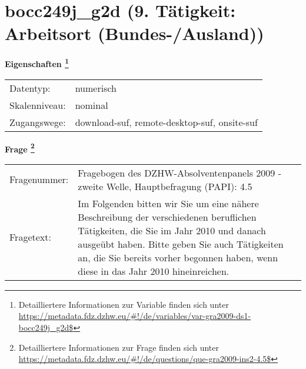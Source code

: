 
    \setcounter{footnote}{0}

    \vspace*{-1.8cm}
	\section{bocc249j\_g2d (9. Tätigkeit: Arbeitsort (Bundes-/Ausland))}
	\label{section:bocc249j_g2d}



    \vspace*{0.5cm}
    \noindent\textbf{Eigenschaften
	\footnote{Detailliertere Informationen zur Variable finden sich unter
		\url{https://metadata.fdz.dzhw.eu/\#!/de/variables/var-gra2009-ds1-bocc249j_g2d$}}}\\
	\begin{tabularx}{\hsize}{@{}lX}
	Datentyp: & numerisch \\
	Skalenniveau: & nominal \\
	Zugangswege: &
	  download-suf, 
	  remote-desktop-suf, 
	  onsite-suf
 \\
    \end{tabularx}



				\vspace*{0.5cm}
                \noindent\textbf{Frage
	                \footnote{Detailliertere Informationen zur Frage finden sich unter
		              \url{https://metadata.fdz.dzhw.eu/\#!/de/questions/que-gra2009-ins2-4.5$}}}\\
				\begin{tabularx}{\hsize}{@{}lX}
					Fragenummer: &
					  Fragebogen des DZHW-Absolventenpanels 2009 - zweite Welle, Hauptbefragung (PAPI):
					  4.5
 \\
					Fragetext: & Im Folgenden bitten wir Sie um eine nähere Beschreibung der verschiedenen beruflichen Tätigkeiten, die Sie im Jahr 2010 und danach ausgeübt haben. Bitte geben Sie auch Tätigkeiten an, die Sie bereits vorher begonnen haben, wenn diese in das Jahr 2010 hineinreichen. \\
				\end{tabularx}





